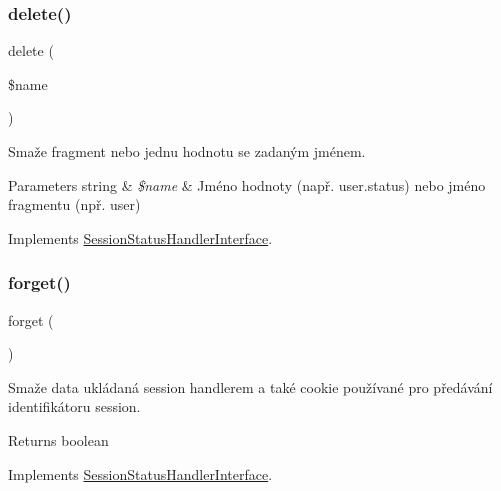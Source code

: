 \subsubsection{\texorpdfstring{delete()}{delete()}}
{\footnotesize\ttfamily delete (\begin{DoxyParamCaption}\item[{}]{\$name }\end{DoxyParamCaption})}

Smaže fragment nebo jednu hodnotu se zadaným jménem.


\begin{DoxyParams}[1]{Parameters}
string & {\em \$name} & Jméno hodnoty (např. user.\+status) nebo jméno fragmentu (npř. user) \\
\hline
\end{DoxyParams}


Implements \mbox{\hyperlink{interface_pes_1_1_session_1_1_session_status_handler_interface}{Session\+Status\+Handler\+Interface}}.

\mbox{\label{class_pes_1_1_session_1_1_session_status_handler_a5fd46320a3fc88f4322cbb025eab7cba}} 
\subsubsection{\texorpdfstring{forget()}{forget()}}
{\footnotesize\ttfamily forget (\begin{DoxyParamCaption}{ }\end{DoxyParamCaption})}

Smaže data ukládaná session handlerem a také cookie používané pro předávání identifikátoru session. \begin{DoxyReturn}{Returns}
boolean 
\end{DoxyReturn}


Implements \mbox{\hyperlink{interface_pes_1_1_session_1_1_session_status_handler_interface}{Session\+Status\+Handler\+Interface}}.

\mbox{\label{class_pes_1_1_session_1_1_session_status_handler_af5ea6a083ddb07beb8a30dd32e309ceb}} 
